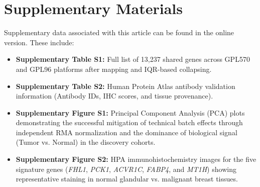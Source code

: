 \documentclass[a4paper,fleqn]{cas-dc}
\newcommand{\gene}[1]{\textit{#1}}
\begin{document}
\section*{Supplementary Materials}
Supplementary data associated with this article can be found in the online version. These include:
\begin{itemize}
    \item \textbf{Supplementary Table S1:} Full list of 13,237 shared genes across GPL570 and GPL96 platforms after mapping and IQR-based collapsing.
    \item \textbf{Supplementary Table S2:} Human Protein Atlas antibody validation information (Antibody IDs, IHC scores, and tissue provenance).
    \item \textbf{Supplementary Figure S1:} Principal Component Analysis (PCA) plots demonstrating the successful mitigation of technical batch effects through independent RMA normalization and the dominance of biological signal (Tumor vs. Normal) in the discovery cohorts.
    \item \textbf{Supplementary Figure S2:} HPA immunohistochemistry images for the five signature genes (\gene{FHL1}, \gene{PCK1}, \gene{ACVR1C}, \gene{FABP4}, and \gene{MT1H}) showing representative staining in normal glandular vs. malignant breast tissues.
\end{itemize}



\end{document}
